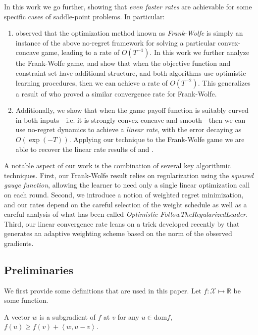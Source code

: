 \documentclass[pmlr]{jmlr} %
\def\reals{\mathbb{R}}
\def\reals{\mathbb{R}}
\newcommand{\lr}[2]{\left\langle#1,#2\right\rangle}
\newcommand{\XX}{\mathcal{X}}
\begin{document}
In this work we go further, showing that \emph{even faster rates} are achievable for some specific cases of saddle-point problems. In particular:
\begin{enumerate}[itemsep=0mm]
	\item \citet{AW17} observed that the optimization method known as \emph{Frank-Wolfe} is simply an instance of the above no-regret framework for solving a particular convex-concave game, leading to a rate of $O(T^{-1})$. In this work we further analyze the Frank-Wolfe game, and
	show that when the objective function and constraint set have additional structure, and both algorithms use optimistic learning procedures, then we can achieve a rate of $O(T^{-2})$. This generalizes a result of \citet{D15} who proved a similar convergence rate for Frank-Wolfe.
  \item Additionally, we show that when the game payoff function is suitably curved in both inputs---i.e. it is strongly-convex-concave and smooth---then we can use no-regret dynamics to achieve a \emph{linear rate}, with the error decaying as $O(\exp(-T))$. Applying our technique to the  {Frank-Wolfe} game we are able 
to recover the linear rate  results of \citet{LP66,DR70} and \cite{D79}. 
	
	
\end{enumerate}
A notable aspect of our work is the combination of several key algorithmic techniques. First, our  Frank-Wolfe result relies on regularization using the \emph{squared gauge function}, allowing the learner to need only a single linear optimization call on each round. Second, we introduce a notion of weighted regret minimization, and our rates depend on the careful selection of the weight schedule as well as a careful analysis of what has been called \emph{Optimistic FollowTheRegularizedLeader}. Third, our linear convergence rate leans on a trick developed recently by \citet{L17} that generates an adaptive weighting scheme based on the norm of the observed gradients.


\subsection{Preliminaries} \label{Pre}

We first provide some definitions that are used in this paper. Let $f:\XX \mapsto \reals$ be some function.

\begin{definition}
	A vector $w$ is a subgradient of $f$ at $v$ for any $u \in \text{dom} f$, $f(u) \ge f(v) + \lr{w}{u-v}$. 
\end{definition}
\end{document}
